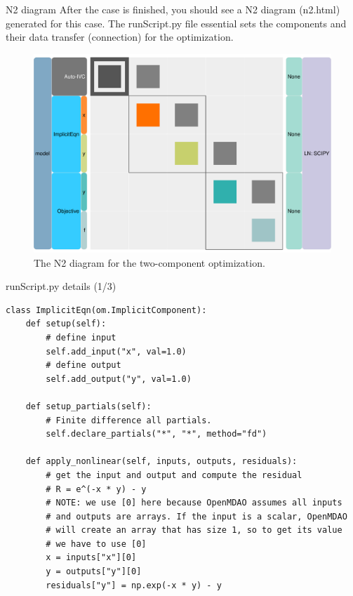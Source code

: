 \documentclass{bredelebeamer}
\begin{document}
\begin{frame}[fragile]{N2 diagram}
  After the case is finished, you should see a N2 diagram (n2.html) generated for this case. The runScript.py file essential sets the components and their data transfer (connection) for the optimization.
  \begin{figure}
    \includegraphics[width=0.8\linewidth]{images/example_n2.pdf} 
    \caption{The N2 diagram for the two-component optimization.}
  \end{figure}
\end{frame}


\begin{frame}[fragile]{runScript.py details (1/3)}
  \footnotesize
  \lstset{ language=python }
  \begin{lstlisting}
class ImplicitEqn(om.ImplicitComponent):
    def setup(self):
        # define input
        self.add_input("x", val=1.0)
        # define output
        self.add_output("y", val=1.0)

    def setup_partials(self):
        # Finite difference all partials.
        self.declare_partials("*", "*", method="fd")

    def apply_nonlinear(self, inputs, outputs, residuals):
        # get the input and output and compute the residual
        # R = e^(-x * y) - y
        # NOTE: we use [0] here because OpenMDAO assumes all inputs
        # and outputs are arrays. If the input is a scalar, OpenMDAO
        # will create an array that has size 1, so to get its value
        # we have to use [0]
        x = inputs["x"][0]
        y = outputs["y"][0]
        residuals["y"] = np.exp(-x * y) - y
  \end{lstlisting}
  \normalsize
\end{frame}
\end{document}
